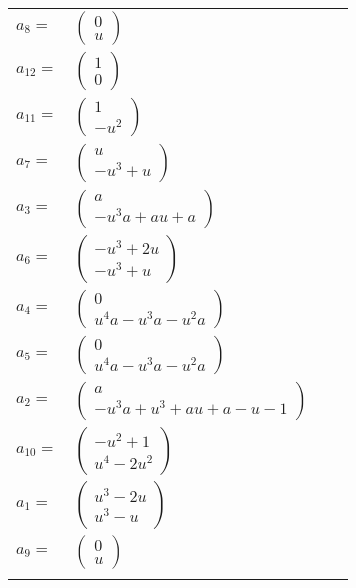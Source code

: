 \documentclass[1p]{elsarticle_modified}
\theoremstyle{definition}
\begin{document}
\begin{tabular}{m{7pt} m{180pt} m{7pt} m{180pt} }
\flushright $a_{8}=$&$\begin{pmatrix}0\\u\end{pmatrix}$ \\
\flushright $a_{12}=$&$\begin{pmatrix}1\\0\end{pmatrix}$ \\
\flushright $a_{11}=$&$\begin{pmatrix}1\\- u^2\end{pmatrix}$ \\
\flushright $a_{7}=$&$\begin{pmatrix}u\\- u^3+u\end{pmatrix}$ \\
\flushright $a_{3}=$&$\begin{pmatrix}a\\- u^3 a+a u+a\end{pmatrix}$ \\
\flushright $a_{6}=$&$\begin{pmatrix}- u^3+2 u\\- u^3+u\end{pmatrix}$ \\
\flushright $a_{4}=$&$\begin{pmatrix}0\\u^4 a- u^3 a- u^2 a\end{pmatrix}$ \\
\flushright $a_{5}=$&$\begin{pmatrix}0\\u^4 a- u^3 a- u^2 a\end{pmatrix}$ \\
\flushright $a_{2}=$&$\begin{pmatrix}a\\- u^3 a+u^3+a u+a- u-1\end{pmatrix}$ \\
\flushright $a_{10}=$&$\begin{pmatrix}- u^2+1\\u^4-2 u^2\end{pmatrix}$ \\
\flushright $a_{1}=$&$\begin{pmatrix}u^3-2 u\\u^3- u\end{pmatrix}$ \\
\flushright $a_{9}=$&$\begin{pmatrix}0\\u\end{pmatrix}$\\&\end{tabular}
\end{document}
